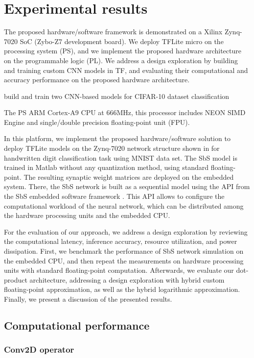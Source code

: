 \section{Experimental results}
\label{sec:experimental_results}
The proposed hardware/software framework is demonstrated on a Xilinx Zynq-7020 SoC (Zybo-Z7 development board). We deploy TFLite micro on the processing system (PS), and we implement the proposed hardware architecture on the programmable logic (PL). We address a design exploration by building and training custom CNN models in TF, and evaluating their computational and accuracy performance on the proposed hardware architecture.

build and train two CNN-based models for CIFAR-10 dataset classification

The PS ARM Cortex-A9 CPU at 666MHz, this processor includes NEON SIMD Engine and single/double precision floating-point unit (FPU)\cite{xilinx2015zynq}.

In this platform, we implement the proposed hardware/software solution to deploy TFLite models on the Zynq-7020 network structure shown in  for handwritten digit classification task using MNIST data set. The SbS model is trained in Matlab without any quantization method, using standard floating-point. The resulting synaptic weight matrices are deployed on the embedded system. There, the SbS network is built as a sequential model using the API from the SbS embedded software framework \cite{nevarez2020accelerator}. This API allows to configure the computational workload of the neural network, which can be distributed among the hardware processing units and the embedded CPU.

For the evaluation of our approach, we address a design exploration by reviewing the computational latency, inference accuracy, resource utilization, and power dissipation. First, we benchmark the performance of SbS network simulation on the embedded CPU, and then repeat the measurements on hardware processing units with standard floating-point computation. Afterwards, we evaluate our dot-product architecture, addressing a design exploration with hybrid custom floating-point approximation, as well as the hybrid logarithmic approximation. Finally, we present a discussion of the presented results.

\subsection{Computational performance}
\subsubsection{Conv2D operator}
